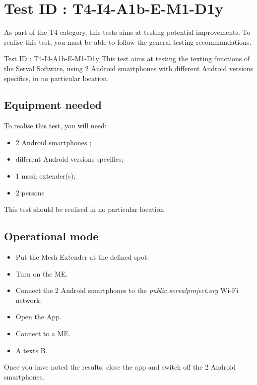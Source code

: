 \documentclass[oneside]{book}
\begin{document}
\section{Test ID : T4-I4-A1b-E-M1-D1y}
\begin{itshape}
As part of the T4 category, this tests aims at testing potential improvements.
To realise this test, you must be able to follow the general testing recommandations. 
\end{itshape}
\newline
Test ID : T4-I4-A1b-E-M1-D1y
 This test aims at testing the texting functions of the Serval Software, using 2 Android smartphones with different Android versions specifics, in no particular location.
\subsection{Equipment needed} To realise this test, you will need:
\begin{itemize}
\item 2 Android smartphones ;
\item different Android versions specifics;
\item 1 mesh extender(s);
\item 2 persons
\end{itemize}
This test should be realised in no particular location.
\subsection{Operational mode} \begin{itemize}
\item Put the Mesh Extender at the defined spot.
\item Turn on the ME.
\item Connect the 2 Android smartphones to the \emph{public.servalproject.org} Wi-Fi network.
\item Open the App.
\item Connect to a ME.
\item A texts B.
\end{itemize}
Once you have noted the results, close the app and switch off the 2 Android smartphones.
\end{document}
